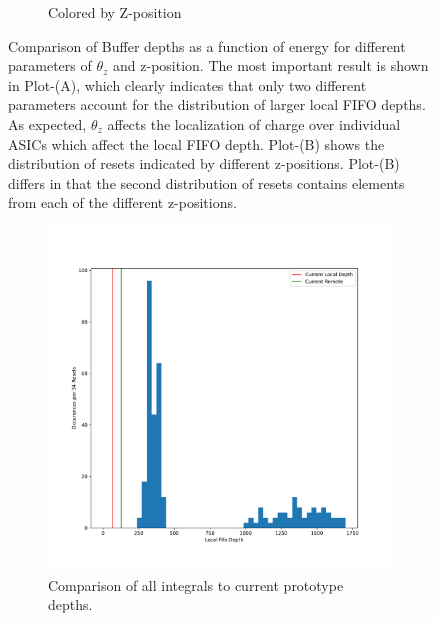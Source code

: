 \begin{figure}
\begin{subfigure}{.5\textwidth}
  \caption{Colored by Z-position}
\end{subfigure}
\caption{Comparison of Buffer depths as a function of energy for different parameters of $\theta_{z}$ and z-position.
The most important result is shown in Plot-(A), which clearly indicates that only two different parameters account for the distribution of larger local FIFO depths.
As expected, $\theta_{z}$ affects the localization of charge over individual ASICs which affect the local FIFO depth.
Plot-(B) shows the distribution of resets indicated by different z-positions.
Plot-(B) differs in that the second distribution of resets contains elements from each of the different z-positions.
}
\label{fig:compare_integral_zpos_theta}
\end{figure}

\begin{figure}
\centering
\begin{subfigure}{.5\textwidth}
  \centering
  \includegraphics[width=\textwidth]{images/df_nolabel_line.pdf}
  \caption{Comparison of all integrals to current prototype depths.}
\end{subfigure}%
\begin{subfigure}{.5\textwidth}
  \centering

\end{subfigure}
\end{figure}
